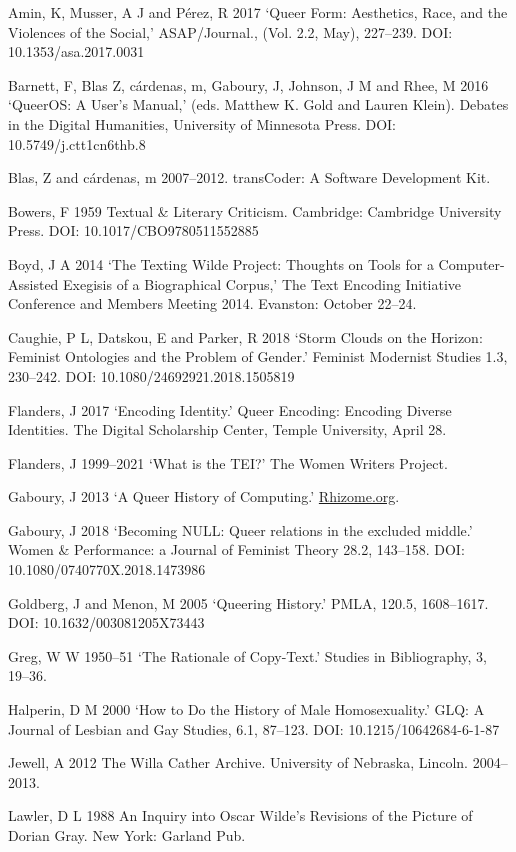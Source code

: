 \documentclass[11pt]{article}
\begin{document}
Amin, K, Musser, A J and Pérez, R 2017 ‘Queer Form:
Aesthetics, Race, and the Violences of the Social,' ASAP/Journal., (Vol.
2.2, May), 227--239. DOI: 10.1353/asa.2017.0031

Barnett, F, Blas Z, cárdenas, m, Gaboury, J, Johnson, J M and
Rhee, M 2016 ‘QueerOS: A User's Manual,' (eds. Matthew K. Gold and
Lauren Klein). Debates in the Digital Humanities, University of
Minnesota Press. DOI: 10.5749/j.ctt1cn6thb.8

Blas, Z and cárdenas, m 2007--2012. transCoder: A Software
Development Kit.

Bowers, F 1959 Textual \& Literary Criticism. Cambridge:
Cambridge University Press. DOI: 10.1017/CBO9780511552885

Boyd, J A 2014 ‘The Texting Wilde Project: Thoughts on Tools
for a Computer-Assisted Exegisis of a Biographical Corpus,' The Text
Encoding Initiative Conference and Members Meeting 2014. Evanston:
October 22--24.

Caughie, P L, Datskou, E and Parker, R 2018 ‘Storm Clouds on
the Horizon: Feminist Ontologies and the Problem of Gender.' Feminist
Modernist Studies 1.3, 230--242. DOI: 10.1080/24692921.2018.1505819

Flanders, J 2017 ‘Encoding Identity.' Queer Encoding: Encoding
Diverse Identities. The Digital Scholarship Center, Temple University,
April 28.

Flanders, J 1999--2021 ‘What is the TEI?' The Women Writers
Project.

Gaboury, J 2013 ‘A Queer History of Computing.'
\url{Rhizome.org}.

Gaboury, J 2018 ‘Becoming NULL: Queer relations in the
excluded middle.' Women \& Performance: a Journal of Feminist Theory
28.2, 143--158. DOI: 10.1080/0740770X.2018.1473986

Goldberg, J and Menon, M 2005 ‘Queering History.' PMLA, 120.5,
1608--1617. DOI: 10.1632/003081205X73443

Greg, W W 1950--51 ‘The Rationale of Copy-Text.' Studies in
Bibliography, 3, 19--36.

Halperin, D M 2000 ‘How to Do the History of Male
Homosexuality.' GLQ: A Journal of Lesbian and Gay Studies, 6.1, 87--123.
DOI: 10.1215/10642684-6-1-87

Jewell, A 2012 The Willa Cather Archive. University of
Nebraska, Lincoln. 2004--2013.

Lawler, D L 1988 An Inquiry into Oscar Wilde's Revisions of
the Picture of Dorian Gray. New York: Garland Pub.
\end{document}
